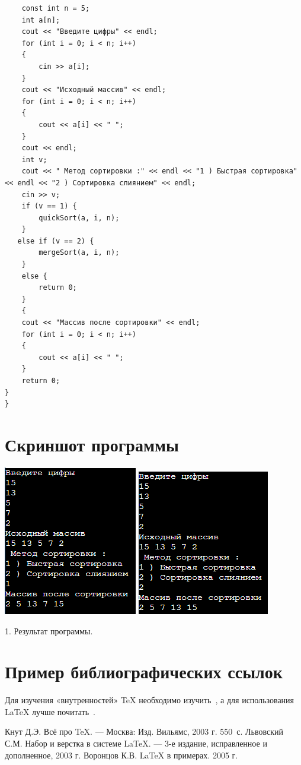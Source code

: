 \documentclass[12pt,a4paper]{scrartcl}
\begin{document}
\begin{verbatim}
    const int n = 5;
    int a[n];
    cout << "Введите цифры" << endl;
    for (int i = 0; i < n; i++)
    {
        cin >> a[i];
    }
    cout << "Исходный массив" << endl;
    for (int i = 0; i < n; i++)
    {
        cout << a[i] << " ";
    }
    cout << endl;
    int v;
    cout << " Метод сортировки :" << endl << "1 ) Быстрая сортировка" << endl << "2 ) Сортировка слиянием" << endl;
    cin >> v;
    if (v == 1) {
        quickSort(a, i, n);
    }
   else if (v == 2) {
        mergeSort(a, i, n);
    }
    else {
        return 0;
    }
    {
    cout << "Массив после сортировки" << endl;
    for (int i = 0; i < n; i++)
    {
        cout << a[i] << " ";
    }
    return 0;
} 
}
\end{verbatim}

\section{Скриншот программы}
\label{sec:intro}
\centering
\includegraphics[scale=1.32]{var1.png}
\includegraphics[scale=1.35]{var2.png}
\caption{1. Результат программы.}\label{fig:par}
\section{Пример библиографических ссылок}

Для изучения «внутренностей» \TeX{} необходимо 
изучить~\cite{Knuth-2003}, а для использования \LaTeX{} лучше
почитать~\cite{Lvovsky-2003, Voroncov-2005}.

\begin{thebibliography}{9}
Кнут Д.Э. Всё про \TeX. \newblock --- Москва: Изд. Вильямс, 2003 г. 550~с.
Львовский С.М. Набор и верстка в системе \LaTeX{}. \newblock --- 3-е издание, исправленное и дополненное, 2003 г.
Воронцов К.В. \LaTeX{} в примерах. 2005 г.
\end{thebibliography}
\end{document}

